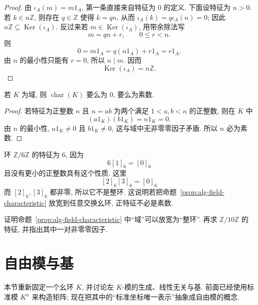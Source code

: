 \documentclass[usesamecnt, thmcnt=section, lang=cn, newtx, 10pt, scheme=chinese]{elegantbook}
\begin{document}
\begin{proof}
由 $\iota_A(m)=m1_A$, 第一条直接来自特征为 $0$ 的定义. 下面设特征为 $n>0$. 若 $k\in n\mathbb Z$, 则存在 $q\in\mathbb Z$ 使得 $k=qn$, 从而 $\iota_A(k)=q\iota_A(n)=0$; 因此 $n\mathbb Z\subseteq\operatorname{Ker}(\iota_A)$. 反过来若 $m\in\operatorname{Ker}(\iota_A)$, 用带余除法写
\[
 m=qn+r,
 \qquad
 0\leq r<n.
\]
则
\[
 0=m1_A=q(n1_A)+r1_A=r1_A.
\]
由 $n$ 的最小性只能有 $r=0$, 所以 $n\mid m$. 因而
\[
 \operatorname{Ker}(\iota_A)=n\mathbb Z.
\]
\end{proof}

\begin{proposition}\label{prop:alg-field-characteristic}
若 $K$ 为域, 则 $\operatorname{char}(K)$ 要么为 $0$, 要么为素数.
\end{proposition}

\begin{proof}
若特征为正整数 $n$ 且 $n=ab$ 为两个满足 $1<a,b<n$ 的正整数, 则在 $K$ 中
\[
 (a1_K)(b1_K)=n1_K=0.
\]
由 $n$ 的最小性, $a1_K\neq0$ 且 $b1_K\neq0$, 这与域中无非零零因子矛盾. 所以 $n$ 必为素数.
\end{proof}

\begin{instance}
环 $\mathbb Z/6\mathbb Z$ 的特征为 $6$, 因为
\[
 6[1]_6=[0]_6
\]
且没有更小的正整数具有这个性质. 这里
\[
 [2]_6[3]_6=[0]_6
\]
而 $[2]_6,[3]_6$ 都非零, 所以它不是整环. 这说明若把命题~\ref{prop:alg-field-characteristic} 放宽到任意交换幺环, 正特征不必是素数.
\end{instance}

\begin{exercise}\label{ex:alg-char-domain}
证明命题~\ref{prop:alg-field-characteristic} 中``域''可以放宽为``整环''. 再求 $\mathbb Z/10\mathbb Z$ 的特征, 并指出其中一对非零零因子.
\end{exercise}






\section{自由模与基}

本节重新固定一个幺环 $K$, 并讨论左 $K$-模的生成、线性无关与基. 前面已经使用标准模 $K^n$ 来构造矩阵; 现在把其中的``标准坐标唯一表示''抽象成自由模的概念.
\end{document}
